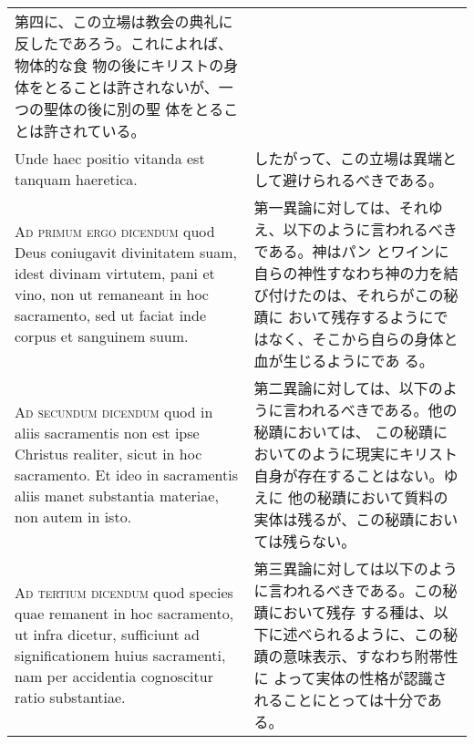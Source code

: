 \documentclass[10pt]{jsarticle} %
\begin{document}
\begin{longtable}{p{21em}p{21em}}
第四に、この立場は教会の典礼に反したであろう。これによれば、物体的な食
物の後にキリストの身体をとることは許されないが、一つの聖体の後に別の聖
体をとることは許されている。

\\



Unde haec positio vitanda est tanquam haeretica.

&

したがって、この立場は異端として避けられるべきである。

\\



{\scshape Ad primum ergo dicendum} quod Deus coniugavit divinitatem
suam, idest divinam virtutem, pani et vino, non ut remaneant in hoc
sacramento, sed ut faciat inde corpus et sanguinem suum.

&

第一異論に対しては、それゆえ、以下のように言われるべきである。神はパン
とワインに自らの神性すなわち神の力を結び付けたのは、それらがこの秘蹟に
おいて残存するようにではなく、そこから自らの身体と血が生じるようにであ
る。


\\



{\scshape Ad secundum dicendum} quod in aliis sacramentis non est ipse
Christus realiter, sicut in hoc sacramento. Et ideo in sacramentis
aliis manet substantia materiae, non autem in isto.

&

第二異論に対しては、以下のように言われるべきである。他の秘蹟においては、
この秘蹟においてのように現実にキリスト自身が存在することはない。ゆえに
他の秘蹟において質料の実体は残るが、この秘蹟においては残らない。

\\



{\scshape Ad tertium dicendum} quod species quae remanent in hoc
sacramento, ut infra dicetur, sufficiunt ad significationem huius
sacramenti, nam per accidentia cognoscitur ratio substantiae.

&

第三異論に対しては以下のように言われるべきである。この秘蹟において残存
する種は、以下に述べられるように、この秘蹟の意味表示、すなわち附帯性に
よって実体の性格が認識されることにとっては十分である。

\\


\end{longtable}
\newpage
\end{document}
